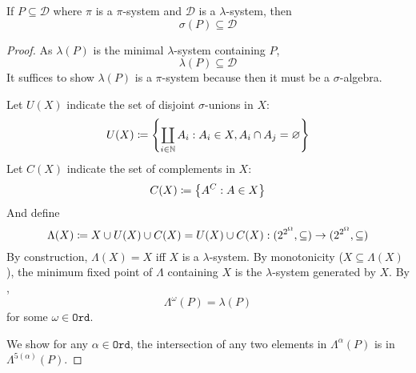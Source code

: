 \documentclass{scrartcl}
\newcommand{\measpace}{\Omega}
\newcommand{\system}{\mathcal D}
\DeclareMathOperator*{\bigdisjunion}{\coprod}
\newcommand{\ordinals}{\texttt{Ord}}
\newcommand{\inclass}{\in}
\begin{document}
\newcommand{\lambdify}{\Lambda}
\newcommand{\lambdagen}{\lambda}
\newcommand{\pisystem}{P}
\newcommand{\dsystem}{\system}
\begin{theorem}
  If \(\pisystem\subseteq \dsystem\) where \(\pi\) is a \(\pi\)-system and \(\dsystem\) is a
  \(\lambda\)-system, then
  \[
    \sigma(\pisystem) \subseteq \dsystem
  \]
\end{theorem}
\begin{proof}
  As \(\lambdagen(\pisystem)\) is the minimal \(\lambda\)-system containing
  \(\pisystem\),
  \[
    \lambdagen(\pisystem)\subseteq\dsystem
  \]
  It suffices to show \(\lambdagen(\pisystem)\) is a
  \(\pi\)-system because then it must be a \(\sigma\)-algebra.

  Let \(U(X)\) indicate the set of disjoint \(\sigma\)-unions in \(X\):
  \[
    U(X)\define\left\{\bigdisjunion_{i\in \N} A_i: A_i\in X, A_i\cap A_j=\emptyset\right\}
  \]
  Let \(C(X)\) indicate the set of complements in \(X\):
  \[
    C(X)\coloneqq\left\{ A^C:A\in X \right\}
  \]
  And define
  \[
    \lambdify(X)\define X\cup U(X) \cup C(X) = U(X)\cup C(X) :
    (2^{2^\measpace},\subseteq ) \to (2^{2^\measpace},\subseteq)
  \]
  By construction, \(\lambdify(X)=X\) iff \(X\) is a \(\lambda\)-system. By monotonicity
  (\(X\subseteq\lambdify(X)\)), the minimum fixed point of \(\lambdify\) containing \(X\)
  is the \(\lambda\)-system generated by \(X\). By ,
  \newcommand{\stopord}{\omega}
  \[
    \lambdify^\stopord(\pisystem)=\lambda(\pisystem)
  \]
  for some \(\stopord\inclass\ordinals\).

  \newcommand{\nextord}{5}
  We show for any \(\alpha\in\ordinals\), the intersection of
  any two elements in \(\lambdify^\alpha(\pisystem)\) is in
  \(\lambdify^{\nextord(\alpha)}(\pisystem)\).


\end{proof}
\end{document}
